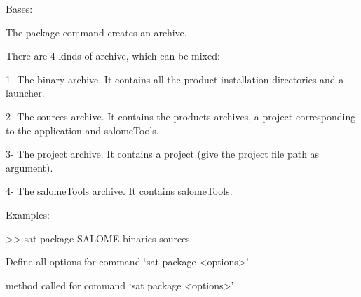 \documentclass[a4paper,10pt,english]{sphinxmanual}
\begin{document}
\begin{fulllineitems}
\label{\detokenize{apidoc_commands/commands:commands.package.Command}}
Bases: 

The package command creates an archive.

\begin{DUlineblock}{0em}
\item[] There are 4 kinds of archive, which can be mixed:
\item[] 1- The binary archive. It contains all the product installation directories and a launcher.
\item[] 2- The sources archive. It contains the products archives, a project corresponding to the application and salomeTools.
\item[] 3- The project archive. It contains a project (give the project file path as argument).
\item[] 4- The salomeTools archive. It contains salomeTools.
\item[] 
\item[] Examples:
\item[] \textgreater{}\textgreater{} sat package SALOME \textendash{}binaries \textendash{}sources
\end{DUlineblock}

\begin{fulllineitems}
\label{\detokenize{apidoc_commands/commands:commands.package.Command.getParser}}
Define all options for command ‘sat package \textless{}options\textgreater{}’

\end{fulllineitems}


\begin{fulllineitems}
\label{\detokenize{apidoc_commands/commands:commands.package.Command.name}}
\end{fulllineitems}


\begin{fulllineitems}
\label{\detokenize{apidoc_commands/commands:commands.package.Command.run}}
method called for command ‘sat package \textless{}options\textgreater{}’

\end{fulllineitems}


\end{fulllineitems}
\end{document}
